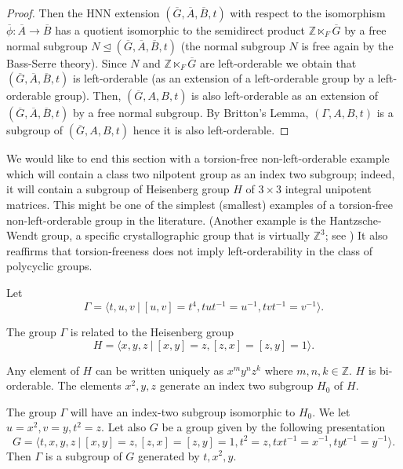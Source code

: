 \documentclass[12pt]{amsart}
\theoremstyle{definition}
\newcommand{\blackboard}[1]{\ensuremath{\mathbb{#1}}}
\newcommand{\Z}{\blackboard{Z}}
\begin{document}
\begin{proof}
    \medskip 

     Then the HNN extension $(\overline{G}, \overline{A}, \overline{B}, t)$ with respect to the isomorphism $\overline {\phi }:\overline{A}\to \overline{B}$ has a quotient isomorphic to the semidirect product $\mathbb{Z}\ltimes _{F}\overline{G}$ by a free normal subgroup $N\trianglelefteq (\overline{G}, \overline{A}, \overline{B}, t)$ (the normal subgroup $N$ is free again by the Bass-Serre theory). Since $N$ and $\mathbb{Z}\ltimes _{F}\overline{G}$ are left-orderable we obtain that $(\overline{G}, \overline{A}, \overline{B}, t)$ is left-orderable (as an extension of a left-orderable group by a left-orderable group). Then, $(\overline{G}, A, B, t)$ is also left-orderable as an extension of $(\overline{G}, \overline{A}, \overline{B}, t)$ by a free normal subgroup. By Britton's Lemma, $(\Gamma , A, B, t)$ is a subgroup of $(\overline{G}, A, B, t)$ hence it is also left-orderable. 
     
    \end{proof}
   

 \medskip
 
 We would like to end this section with a torsion-free non-left-orderable example which will contain a class two nilpotent group as an index two subgroup; indeed, it will contain a subgroup of Heisenberg group $H$ of $3\times 3$ integral unipotent matrices. This might be one of the simplest (smallest) examples of a torsion-free non-left-orderable group in the literature. (Another example is the Hantzsche-Wendt group, a specific crystallographic group that is virtually $\Z ^3$; see \cite{BRW}) It also reaffirms that torsion-freeness does not imply left-orderability in the class of polycyclic groups. 
 
 \medskip
 
 Let $$\Gamma = \langle t, u, v \ | \ [u,v] = t^4, tut^{-1} = u^{-1}, tvt^{-1} = v^{-1}\rangle .$$
 
 The group $\Gamma $ is related to the Heisenberg group $$H = \langle x, y, z \ | \ [x, y] = z, [z, x] = [z, y] = 1\rangle .$$
 
 Any element of $H$ can be written uniquely as $x^my^nz^k$ where $m, n, k\in \Z$. $H$ is bi-orderable. The elements $x^2, y, z$ generate an index two subgroup $H_0$ of $H$. 
 
 \medskip
 
 The group $\Gamma $ will have an index-two subgroup isomorphic to $H_0$. We let $u = x^2, v = y, t^2 = z$. Let also $G$ be a group given by the following presentation $$G = \langle t, x, y, z \ | \ [x, y] = z, [z, x] = [z, y] = 1, t^2 = z, txt^{-1} = x^{-1}, tyt^{-1} = y^{-1}\rangle .$$ Then $\Gamma $ is a subgroup of $G$ generated by $t, x^2, y$.
 
\end{document}
